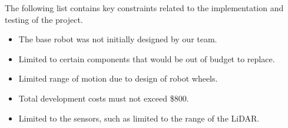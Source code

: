 


The following list contains key constraints related to the implementation and testing of the project.

\begin{itemize}
  \item The base robot was not initially designed by our team.
  \item Limited to certain components that would be out of budget to replace.
  \item Limited range of motion due to design of robot wheels.
  \item Total development costs must not exceed \$800.
  \item Limited to the sensors, such as limited to the range of the LiDAR.
\end{itemize}

